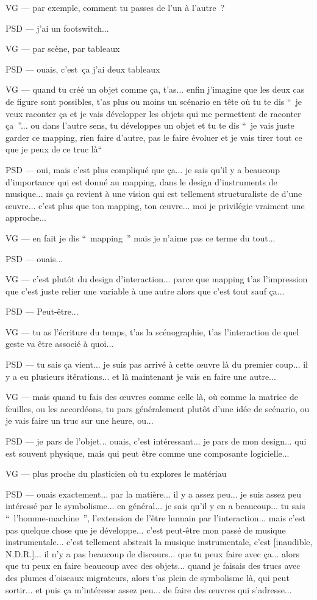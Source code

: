 VG — par exemple, comment tu passes de l'un à l'autre ?

PSD — j'ai un footswitch...

VG — par scène, par tableaux

PSD — ouais, c'est ça j'ai deux tableaux

VG — quand tu créé un objet comme ça, t'as... enfin j'imagine que les deux cas de figure sont possibles, t'as plus ou moins un scénario en tête où tu te dis “ je veux raconter ça et je vais développer les objets qui me permettent de raconter ça ”... ou dans l'autre sens, tu développes un objet et tu te dis “ je vais juste garder ce mapping, rien faire d'autre, pas le faire évoluer et je vais tirer tout ce que je peux de ce truc là“ 

PSD — oui, mais c'est plus compliqué que ça... je sais qu'il y a beaucoup d'importance qui est donné au mapping, dans le design d'instruments de musique... mais ça revient à une vision qui est tellement structuraliste de d'une œuvre... c'est plus que ton mapping, ton œuvre... moi je privilégie vraiment une approche...

VG — en fait je dis “ mapping ” mais je n'aime pas ce terme du tout...

PSD — ouais... 

VG — c'est plutôt du design d'interaction... parce que mapping t'as l'impression que c'est juste relier une variable à une autre alors que c'est tout sauf ça...

PSD — Peut-être...

VG — tu as l'écriture du temps, t'as la scénographie, t'as l'interaction de quel geste va être associé à quoi...

PSD — tu sais ça vient... je suis pas arrivé à cette œuvre là du premier coup... il y a eu plusieurs itérations... et là maintenant je vais en faire une autre...

VG — mais quand tu fais des œuvres comme celle là, où comme la matrice de feuilles, ou les accordéons, tu pars généralement plutôt d'une idée de scénario, ou je vais faire un truc sur une heure, ou...

PSD — je pars de l'objet... ouais, c'est intéressant... je pars de mon design... qui est souvent physique, mais qui peut être comme une composante logicielle...

VG — plus proche du plasticien où tu explores le matériau

PSD — ouais exactement... par la matière... il y a assez peu... je suis assez peu intéressé par le symbolisme... en général... je sais qu'il y en a beaucoup... tu sais “ l'homme-machine ”,  l'extension de l'être humain par l'interaction... mais c'est pas quelque chose que je développe... c'est peut-être mon passé de musique instrumentale... c'est tellement abstrait la musique instrumentale, c'est [inaudible, N.D.R.]... il n'y a pas beaucoup de discours... que tu peux faire avec ça... alors que tu peux en faire beaucoup avec des objets... quand je faisais des trucs avec des plumes d'oiseaux migrateurs, alors t'as plein de symbolisme là, qui peut sortir... et puis ça m'intéresse assez peu... de faire des œuvres qui s'adresse...


